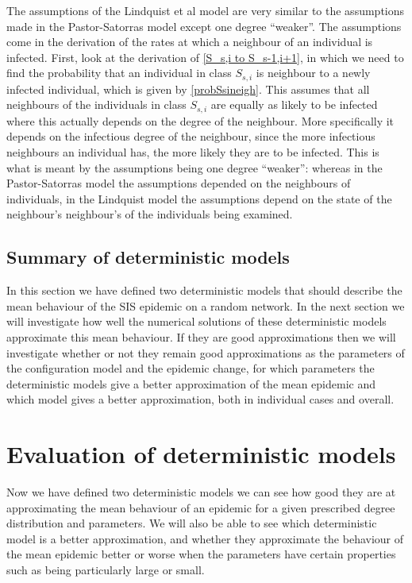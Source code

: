 \documentclass{uonmathsreport}
\begin{document}
The assumptions of the Lindquist et al model are very similar to the assumptions made in the Pastor-Satorras model except one degree ``weaker''. The assumptions come in the derivation of the rates at which a neighbour of an individual is infected. First, look at the derivation of \eqref{S_s,i to S_s-1,i+1}, in which we need to find the probability that an individual in class $S_{s,i}$ is neighbour to a newly infected individual, which is given by \eqref{probSsineigh}. This assumes that all neighbours of the individuals in class $S_{s,i}$ are equally as likely to be infected where this actually depends on the degree of the neighbour. More specifically it depends on the infectious degree of the neighbour, since the more infectious neighbours an individual has, the more likely they are to be infected. This is what is meant by the assumptions being one degree ``weaker'': whereas in the Pastor-Satorras model the assumptions depended on the neighbours of individuals, in the Lindquist model the assumptions depend on the state of the neighbour's neighbour's of the individuals being examined. 

\subsection{Summary of deterministic models} \label{subsec:6.3}

In this section we have defined two deterministic models that should describe the mean behaviour of the SIS epidemic on a random network. In the next section we will investigate how well the numerical solutions of these deterministic models approximate this mean behaviour. If they are good approximations then we will investigate whether or not they remain good approximations as the parameters of the configuration model and the epidemic change, for which parameters the deterministic models give a better approximation of the mean epidemic and which model gives a better approximation, both in individual cases and overall.

\newpage
\section{Evaluation of deterministic models} \label{sec:7}

Now we have defined two deterministic models we can see how good they are at approximating the mean behaviour of an epidemic for a given prescribed degree distribution and parameters. We will also be able to see which deterministic model is a better approximation, and whether they approximate the behaviour of the mean epidemic better or worse when the parameters have certain properties such as being particularly large or small. 
\end{document}
